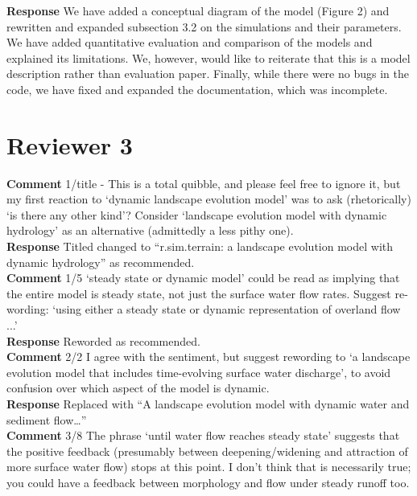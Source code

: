\documentclass[gmd, manuscript]{copernicus}
\begin{document}
\noindent\textbf{Response}
We have added a conceptual diagram of the model (Figure 2) and  rewritten and expanded subsection 3.2  on the simulations and their parameters. We have added quantitative evaluation and comparison of the models and explained its limitations. We, however, would like to reiterate that this is a model description rather than evaluation paper. Finally, while there were no bugs in the code, we have fixed and expanded the documentation, which was incomplete. 
\\

\section{Reviewer 3}

\noindent\textbf{Comment}
1/title - This is a total quibble, and please feel free to ignore it, but my first reaction to `dynamic landscape evolution model' was to ask (rhetorically) `is there any other kind'? Consider `landscape evolution model with dynamic hydrology' as an alternative (admittedly a less pithy one). 
\\

\noindent\textbf{Response}
Titled changed to ``r.sim.terrain: a landscape evolution model with dynamic hydrology'' as recommended. 
\\

\noindent\textbf{Comment}
1/5 `steady state or dynamic model' could be read as implying that the entire model is steady state, not just the surface water flow rates. Suggest re-wording: `using either a steady state or dynamic representation of overland flow ...'
\\

\noindent\textbf{Response}
Reworded as recommended. 
\\

\noindent\textbf{Comment}
2/2 I agree with the sentiment, but suggest rewording to `a landscape evolution model that includes time-evolving surface water discharge', to avoid confusion over which aspect of the model is dynamic.
\\

\noindent\textbf{Response}
Replaced with ``A landscape evolution model with dynamic water and sediment flow…''
\\

\noindent\textbf{Comment}
3/8 The phrase `until water flow reaches steady state' suggests that the positive feedback (presumably between deepening/widening and attraction of more surface water flow) stops at this point. I don't think that is necessarily true; you could have a feedback between morphology and flow under steady runoff too.
\\
\end{document}
